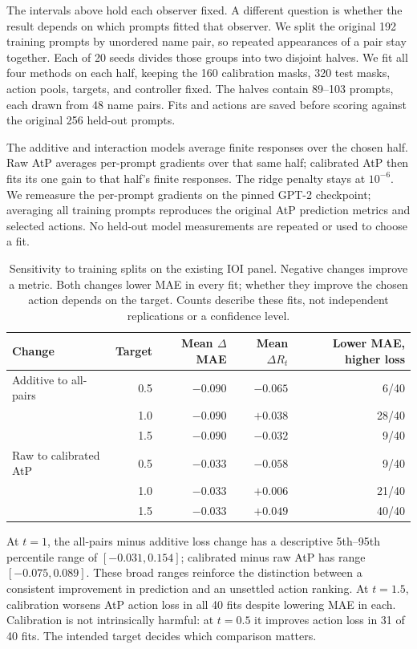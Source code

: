 The intervals above hold each observer fixed. A different question is whether
the result depends on which prompts fitted that observer. We split the
original 192 training prompts by unordered name pair, so repeated appearances
of a pair stay together. Each of 20 seeds divides those groups into two
disjoint halves. We fit all four methods on each half, keeping the 160
calibration masks, 320 test masks, action pools, targets, and controller fixed.
The halves contain 89--103 prompts, each drawn from 48 name pairs. Fits and actions are saved before scoring
against the original 256 held-out prompts.

The additive and interaction models average finite responses over the chosen
half. Raw AtP averages per-prompt gradients over that same half; calibrated
AtP then fits its one gain to that half's finite responses. The ridge penalty
stays at $10^{-6}$. We remeasure the per-prompt gradients on the pinned GPT-2
checkpoint; averaging all training prompts reproduces the original AtP
prediction metrics and selected actions. No held-out model measurements are
repeated or used to choose a fit.

\begin{table}[H]
\centering
\small
\begin{tabular}{@{}lrrrr@{}}
\toprule
Change & Target & Mean $\Delta$MAE & Mean $\Delta R_t$ & Lower MAE, higher loss \\
\midrule
Additive to all-pairs & 0.5 & $-0.090$ & $-0.065$ & 6/40 \\
                     & 1.0 & $-0.090$ & $+0.038$ & 28/40 \\
                     & 1.5 & $-0.090$ & $-0.032$ & 9/40 \\
Raw to calibrated AtP & 0.5 & $-0.033$ & $-0.058$ & 9/40 \\
                      & 1.0 & $-0.033$ & $+0.006$ & 21/40 \\
                      & 1.5 & $-0.033$ & $+0.049$ & 40/40 \\
\bottomrule
\end{tabular}
\caption{Sensitivity to training splits on the existing IOI panel. Negative
changes improve a metric. Both changes lower MAE in every fit; whether they
improve the chosen action depends on the target. Counts describe these fits,
not independent replications or a confidence level.}
\label{tab:ioi-refits}
\end{table}

At $t=1$, the all-pairs minus additive loss change has a descriptive
5th--95th percentile range of $[-0.031,0.154]$; calibrated minus raw AtP has
range $[-0.075,0.089]$. These broad ranges reinforce the distinction between
a consistent improvement in prediction and an unsettled action ranking.
At $t=1.5$, calibration worsens AtP action loss in all 40 fits despite lowering
MAE in each. Calibration is not intrinsically harmful: at $t=0.5$ it improves
action loss in 31 of 40 fits. The intended target decides which comparison
matters.

